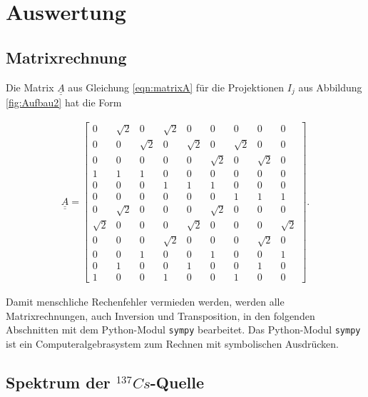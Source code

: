 \section{Auswertung}
\label{sec:Auswertung}

\subsection{Matrixrechnung}

Die Matrix $\underline{\underline{A}}$ aus Gleichung \ref{eqn:matrixA} für die Projektionen $I_j$ aus Abbildung \ref{fig:Aufbau2} hat die Form 

\begin{align}
  \underline{\underline{A}} = \left[\begin{matrix}0 & \sqrt{2} & 0 & \sqrt{2} & 0 & 0 & 0 & 0 & 0\\0 & 0 & \sqrt{2} & 0 & \sqrt{2} & 0 & \sqrt{2} & 0 & 0\\0 & 0 & 0 & 0 & 0 & \sqrt{2} & 0 & \sqrt{2} & 0\\1 & 1 & 1 & 0 & 0 & 0 & 0 & 0 & 0\\0 & 0 & 0 & 1 & 1 & 1 & 0 & 0 & 0\\0 & 0 & 0 & 0 & 0 & 0 & 1 & 1 & 1\\0 & \sqrt{2} & 0 & 0 & 0 & \sqrt{2} & 0 & 0 & 0\\\sqrt{2} & 0 & 0 & 0 & \sqrt{2} & 0 & 0 & 0 & \sqrt{2}\\0 & 0 & 0 & \sqrt{2} & 0 & 0 & 0 & \sqrt{2} & 0\\0 & 0 & 1 & 0 & 0 & 1 & 0 & 0 & 1\\0 & 1 & 0 & 0 & 1 & 0 & 0 & 1 & 0\\1 & 0 & 0 & 1 & 0 & 0 & 1 & 0 & 0\end{matrix}\right].
\end{align}

Damit menschliche Rechenfehler vermieden werden, werden alle Matrixrechnungen, auch Inversion und Transposition, in den folgenden Abschnitten mit dem Python-Modul \texttt{sympy} \cite{sympy} bearbeitet. Das Python-Modul \texttt{sympy} ist ein Computeralgebrasystem zum Rechnen mit symbolischen Ausdrücken. 

 
\subsection{Spektrum der $^{137}Cs$-Quelle}

